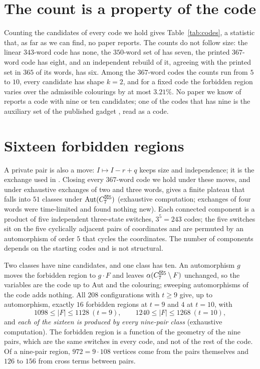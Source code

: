 \section{The count is a property of the code}
\label{sec:count}



Counting the candidates of every code we hold gives Table~\ref{tab:codes}, a statistic that, as far as
we can find, no paper reports. The counts do not follow size: the linear $343$-word code
\cite{baumert1971} has none, the $350$-word set of \cite{mathew2017} has seven, the printed
$367$-word code has eight, and an independent rebuild of it, agreeing with the printed set in $365$
of its words, has six. Among the $367$-word codes the counts run from $5$ to $10$, every candidate has
shape $k=2$, and for a fixed code the forbidden region varies over the admissible colourings by at
most $3.21\%$. No paper we know of reports a code with nine or ten candidates; one of the codes that has nine is
the auxiliary set of the published gadget \cite{gao2026}, read as a code.

\section{Sixteen forbidden regions}
\label{sec:regions}

A private pair is also a move: $I\mapsto I-r+q$ keeps size and independence; it is the exchange used
in \cite{tandon2026}. Closing every $367$-word code we hold under these moves, and under exhaustive
exchanges of two and three words, gives a finite plateau that falls into $51$ classes under
$\mathrm{Aut}(C_7^{\boxtimes 5})$ (exhaustive computation; exchanges of four words were time-limited
and found nothing new). Each connected component is a product of five independent three-state
switches, $3^5=243$ codes; the five switches sit on the five cyclically adjacent pairs of coordinates
and are permuted by an automorphism of order $5$ that cycles the coordinates. The number of
components depends on the starting codes and is not structural.

Two classes have nine candidates, and one class has ten. An automorphism $g$ moves the forbidden
region to $g\cdot F$ and leaves $\alpha(C_7^{\boxtimes5}\setminus F)$ unchanged, so the variables are the
code up to $\mathrm{Aut}$ and the colouring; sweeping automorphisms of the code adds nothing. All
$208$ configurations with $t\ge9$ give, up to automorphism, exactly $16$ forbidden regions at $t=9$
and $4$ at $t=10$, with
\[
  1098\le|F|\le1128\ (t=9),\qquad 1240\le|F|\le1268\ (t=10),
\]
and \emph{each of the sixteen is produced by every nine-pair class} (exhaustive computation). The
forbidden region is a function of the geometry of the nine pairs, which are the same switches in
every code, and not of the rest of the code. Of a nine-pair region, $972=9\cdot108$ vertices come
from the pairs themselves and $126$ to $156$ from cross terms between pairs.

